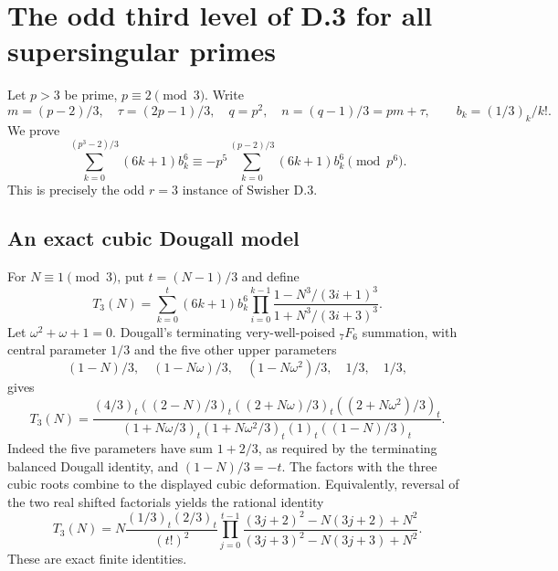 \documentclass[11pt,letterpaper]{article}
\numberwithin{equation}{section}
\begin{document}
\section{The odd third level of D.3 for all supersingular primes}\label{loc-IV-4}
\label{IV-sec:D-cubic}
Let $p>3$ be prime, $p\equiv2\pmod3$. Write
\[
 m=(p-2)/3,\quad \tau=(2p-1)/3,\quad q=p^2,\quad n=(q-1)/3=pm+\tau,
 \qquad b_k=(1/3)_k/k!.
\]
We prove
\begin{equation}\label{IV-dcubic:main}
 \sum_{k=0}^{(p^3-2)/3}(6k+1)b_k^6
 \equiv-p^5\sum_{k=0}^{(p-2)/3}(6k+1)b_k^6\pmod{p^6}.
\end{equation}
This is precisely the odd $r=3$ instance of Swisher D.3.

\subsection{An exact cubic Dougall model}
For $N\equiv1\pmod3$, put $t=(N-1)/3$ and define
\[
 T_3(N)=\sum_{k=0}^t(6k+1)b_k^6
 \prod_{i=0}^{k-1}\frac{1-N^3/(3i+1)^3}{1+N^3/(3i+3)^3}.
\]
Let $\omega^2+\omega+1=0$. Dougall's terminating very-well-poised
${}_7F_6$ summation, with central parameter $1/3$ and the five other
upper parameters
\[
 (1-N)/3,\quad(1-N\omega)/3,\quad(1-N\omega^2)/3,\quad1/3,\quad1/3,
\]
gives
\begin{equation}\label{IV-dcubic:product}
 T_3(N)=
 \frac{(4/3)_t((2-N)/3)_t((2+N\omega)/3)_t((2+N\omega^2)/3)_t}
 {(1+N\omega/3)_t(1+N\omega^2/3)_t(1)_t((1-N)/3)_t}.
\end{equation}
Indeed the five parameters have sum $1+2/3$, as required by the
terminating balanced Dougall identity, and $(1-N)/3=-t$.
The factors with the three cubic roots combine to the displayed
cubic deformation. Equivalently, reversal of the two real shifted
factorials yields the rational identity
\begin{equation}\label{IV-dcubic:rational}
 T_3(N)=N\frac{(1/3)_t(2/3)_t}{(t!)^2}
 \prod_{j=0}^{t-1}
 \frac{(3j+2)^2-N(3j+2)+N^2}
 {(3j+3)^2-N(3j+3)+N^2}.
\end{equation}
These are exact finite identities.
\end{document}
